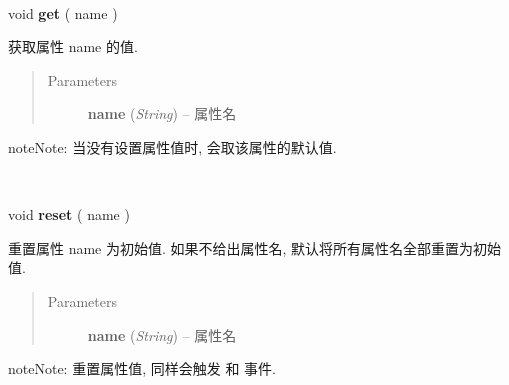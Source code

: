 \documentclass[letterpaper,10pt,english]{sphinxmanual}
\begin{document}
\begin{fulllineitems}
\label{api/core/base/attribute:attribute.get}~
\begin{DUlineblock}{0em}
\item[] void \textbf{get} ( name )
\item[] 获取属性 name 的值.
\end{DUlineblock}
\begin{quote}\begin{description}
\item[{Parameters}] \leavevmode
\textbf{name} (\emph{String}) -- 属性名

\end{description}\end{quote}

\begin{notice}{note}{Note:}
当没有设置属性值时, 会取该属性的默认值.
\end{notice}

\end{fulllineitems}



\begin{fulllineitems}
\label{api/core/base/attribute:attribute.reset}~
\begin{DUlineblock}{0em}
\item[] void \textbf{reset} ( name )
\item[] 重置属性 name 为初始值. 如果不给出属性名, 默认将所有属性名全部重置为初始值.
\end{DUlineblock}
\begin{quote}\begin{description}
\item[{Parameters}] \leavevmode
\textbf{name} (\emph{String}) -- 属性名

\end{description}\end{quote}

\begin{notice}{note}{Note:}
重置属性值, 同样会触发 {\hyperref[api/core/base/attribute:attribute.beforeAttrNameChange]{}} 和 {\hyperref[api/core/base/attribute:attribute.afterAttrNameChange]{}} 事件.
\end{notice}

\end{fulllineitems}
\end{document}
